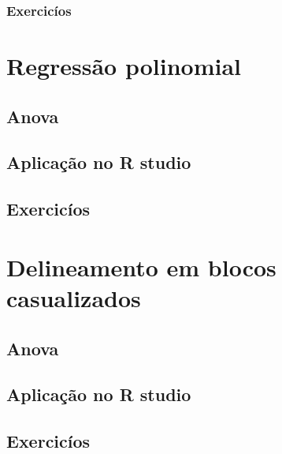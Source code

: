\documentclass[
]{book}
\begin{document}
\hypertarget{exercicuxedos-7}{%
\subsection{Exercicíos}\label{exercicuxedos-7}}

\hypertarget{regressuxe3o-polinomial}{%
\chapter{Regressão polinomial}\label{regressuxe3o-polinomial}}

\hypertarget{anova}{%
\section{Anova}\label{anova}}

\hypertarget{aplicauxe7uxe3o-no-r-studio-8}{%
\section{Aplicação no R studio}\label{aplicauxe7uxe3o-no-r-studio-8}}

\hypertarget{exercicuxedos-8}{%
\section{Exercicíos}\label{exercicuxedos-8}}

\hypertarget{delineamento-em-blocos-casualizados}{%
\chapter{Delineamento em blocos casualizados}\label{delineamento-em-blocos-casualizados}}

\hypertarget{anova-1}{%
\section{Anova}\label{anova-1}}

\hypertarget{aplicauxe7uxe3o-no-r-studio-9}{%
\section{Aplicação no R studio}\label{aplicauxe7uxe3o-no-r-studio-9}}

\hypertarget{exercicuxedos-9}{%
\section{Exercicíos}\label{exercicuxedos-9}}
\end{document}
